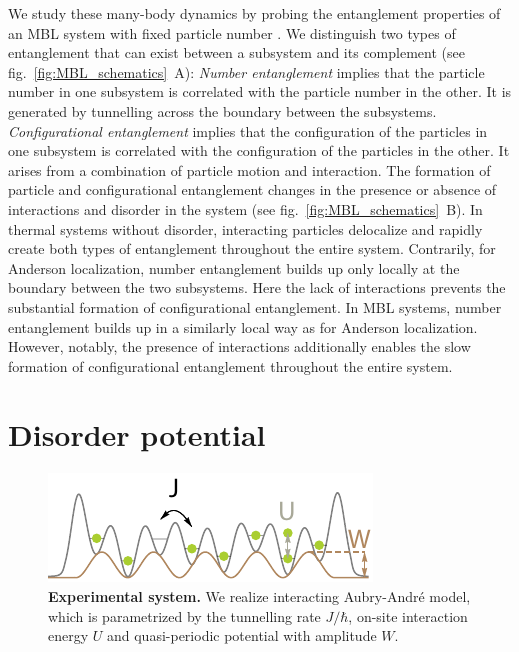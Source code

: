 We study these many-body dynamics by probing the entanglement properties of an MBL system with fixed particle number \cite{ Znidaric2008, Bardarson2012, Serbyn2013, Serbyn2013a, Huse2014}. We distinguish two types of entanglement that can exist between a subsystem and its complement (see fig.~\ref{fig:MBL_schematics}~A): \textit{Number entanglement} implies that the particle number in one subsystem is correlated with the particle number in the other. It is generated by tunnelling across the boundary between the subsystems. \textit{Configurational entanglement} implies that the configuration of the particles in one subsystem is correlated with the configuration of the particles in the other. It arises from a combination of particle motion and interaction. The formation of particle and configurational entanglement changes in the presence or absence of interactions and disorder in the system (see fig.~\ref{fig:MBL_schematics}~B). In thermal systems without disorder, interacting particles delocalize and rapidly create both types of entanglement throughout the entire system. Contrarily, for Anderson localization, number entanglement builds up only locally at the boundary between the two subsystems. Here the lack of interactions prevents the substantial formation of configurational entanglement. In MBL systems, number entanglement builds up in a similarly local way as for Anderson localization. However, notably, the presence of interactions additionally enables the slow formation of configurational entanglement throughout the entire system. 

\section{Disorder potential}

\begin{figure}[t]
	\centering
	\includegraphics{figures/MBL_setup.pdf}
	\caption{\label{fig:MBL_model} \textbf{Experimental system.} We realize interacting Aubry-Andr\'e model, which is parametrized by the tunnelling rate $J/\hbar$, on-site interaction energy $U$ and quasi-periodic potential with amplitude $W$.}
\end{figure}

